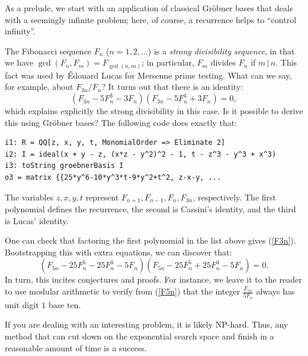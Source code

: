 As a prelude, we start with an application of classical Gr\"obner bases that deals with a seemingly infinite problem; here, of course, a recurrence helps to ``control infinity''.  

The Fibonacci sequence $F_n$ ($n= 1, 2, \ldots$) is a \textit{strong divisibility sequence}, in that we have $\gcd(F_n, F_m) = F_{\gcd(n,m)}$; in particular, $F_m$ divides $F_n$ if $m \, | \, n$.  This fact was used by \'Edouard Lucas for Mersenne prime testing.  What can we say, for example, about $F_{3n}/F_n$?  It turns out that there is an identity:
\begin{equation}\label{F3n}
(F_{3n} - 5 F_n^3 - 3 F_n)(F_{3n} - 5 F_n^3 + 3 F_n) = 0,
\end{equation}
which explains explicitly the strong divisibility in this case.   Is it possible to derive this using Gr\"obner bases?  The following code does exactly that:
\begin{M2}
\begin{verbatim}
i1: R = QQ[z, x, y, t, MonomialOrder => Eliminate 2]
i2: I = ideal(x + y - z, (x*z - y^2)^2 - 1, t - z^3 - y^3 + x^3)
i3: toString groebnerBasis I
o3 = matrix {{25*y^6-10*y^3*t-9*y^2+t^2, z-x-y, ...
\end{verbatim}
\end{M2}  
The variables $z,x,y,t$ represent $F_{n+1}, F_{n-1}, F_n, F_{3n}$, respectively.  The first polynomial defines the recurrence, the second is Cassini's identity, and the third is Lucas' identity.

One can check that factoring the first polynomial in the list above gives (\ref{F3n}).  Bootstrapping this with extra equations, we can discover that:
\begin{equation}\label{F5n}
(F_{5n} - 25 F_n^5 - 25 F_n^3 - 5 F_n)(F_{5n} - 25 F_n^5 + 25 F_n^3 - 5 F_n) = 0.
\end{equation}
In turn, this incites conjectures and proofs.  
For instance, we leave it to the reader to use modular arithmetic to verify from (\ref{F5n}) that the integer $\frac{F_{5n}}{5F_n}$ always has unit digit $1$ base ten.  

\iffalse
If you are dealing with an interesting problem, it is likely NP-hard.  Thus, any method that can cut down on the exponential search space and finish in a reasonable amount of time is a success.  

